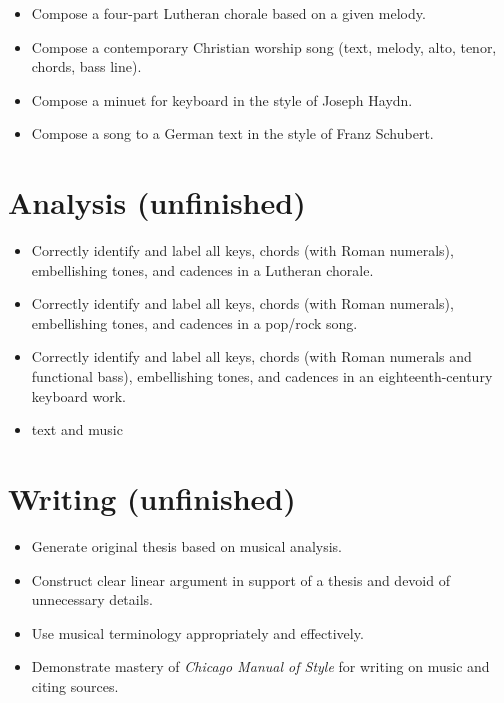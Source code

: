 \begin{itemize}
\item Compose a four-part Lutheran chorale based on a given melody.

\item Compose a contemporary Christian worship song (text, melody, alto, tenor, chords, bass line).

\item Compose a minuet for keyboard in the style of Joseph Haydn.

\item Compose a song to a German text in the style of Franz Schubert.

\end{itemize}

\section{Analysis (unfinished)}
\label{analysisunfinished}

\begin{itemize}
\item Correctly identify and label all keys, chords (with Roman numerals), embellishing tones, and cadences in a Lutheran chorale.

\item Correctly identify and label all keys, chords (with Roman numerals), embellishing tones, and cadences in a pop\slash rock song.

\item Correctly identify and label all keys, chords (with Roman numerals and functional bass), embellishing tones, and cadences in an eighteenth-century keyboard work.

\item text and music

\end{itemize}

\section{Writing (unfinished)}
\label{writingunfinished}

\begin{itemize}
\item Generate original thesis based on musical analysis.

\item Construct clear linear argument in support of a thesis and devoid of unnecessary details.

\item Use musical terminology appropriately and effectively.

\item Demonstrate mastery of \emph{Chicago Manual of Style} for writing on music and citing sources.

\end{itemize}

